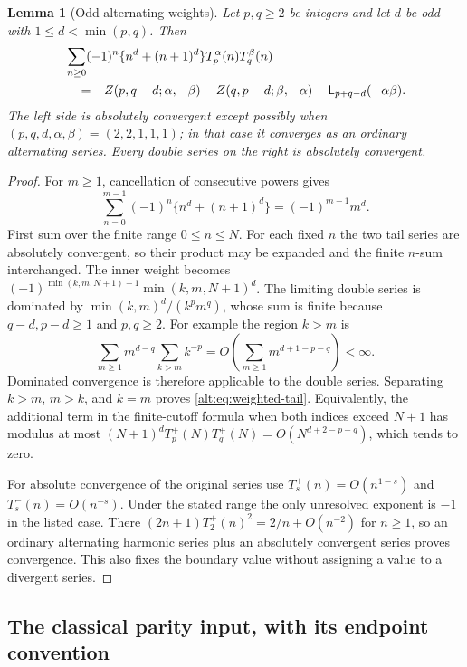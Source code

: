 \documentclass[11pt]{article}
\newtheorem{lemma}[theorem]{Lemma}
\theoremstyle{definition}
\theoremstyle{remark}
\numberwithin{equation}{section}
\begin{document}
\begin{lemma}[Odd alternating weights]
\label{alt:lem:finitecutoff}
Let $p,q\ge2$ be integers and let $d$ be odd with
$1\le d<\min(p,q)$. Then
\begin{align}
 &\sum_{n\ge0}(-1)^n\{n^d+(n+1)^d\}
                    T_p^\alpha(n)T_q^\beta(n)\notag\\
 &\quad=-Z(p,q-d;\alpha,-\beta)
        -Z(q,p-d;\beta,-\alpha)
        -\mathsf L_{p+q-d}(-\alpha\beta).
 \label{alt:eq:weighted-tail}
\end{align}
The left side is absolutely convergent except possibly when
$(p,q,d,\alpha,\beta)=(2,2,1,1,1)$; in that case it converges as
an ordinary alternating series. Every double series on the right is
absolutely convergent.
\end{lemma}

\begin{proof}
For $m\ge1$, cancellation of consecutive powers gives
\[
 \sum_{n=0}^{m-1}(-1)^n\{n^d+(n+1)^d\}
       =(-1)^{m-1}m^d.
\]
First sum over the finite range $0\le n\le N$. For each fixed $n$
the two tail series are absolutely convergent, so their product may
be expanded and the finite $n$-sum interchanged. The inner weight
becomes $(-1)^{\min(k,m,N+1)-1}\min(k,m,N+1)^d$.
The limiting double series is dominated by
$\min(k,m)^d/(k^p m^q)$, whose sum is finite because $q-d,p-d\ge1$
and $p,q\ge2$. For example the region $k>m$ is
\[
 \sum_{m\ge1}m^{d-q}\sum_{k>m}k^{-p}
       =O\left(\sum_{m\ge1}m^{d+1-p-q}\right)<\infty.
\]
Dominated convergence is therefore applicable to the double series.
Separating $k>m$, $m>k$, and $k=m$ proves
\eqref{alt:eq:weighted-tail}. Equivalently, the additional term in the
finite-cutoff formula when both indices exceed $N+1$ has modulus at
most $(N+1)^d T_p^+(N)T_q^+(N)=O(N^{d+2-p-q})$, which tends to zero.

For absolute convergence of the original series use
$T_s^+(n)=O(n^{1-s})$ and $T_s^-(n)=O(n^{-s})$.
Under the stated range the only unresolved exponent is $-1$ in the
listed case. There
$(2n+1)T_2^+(n)^2=2/n+O(n^{-2})$ for $n\ge1$, so an ordinary
alternating harmonic series plus an absolutely convergent series
proves convergence. This also fixes the boundary value without
assigning a value to a divergent series.
\end{proof}

\subsection{The classical parity input, with its endpoint convention}
\end{document}
